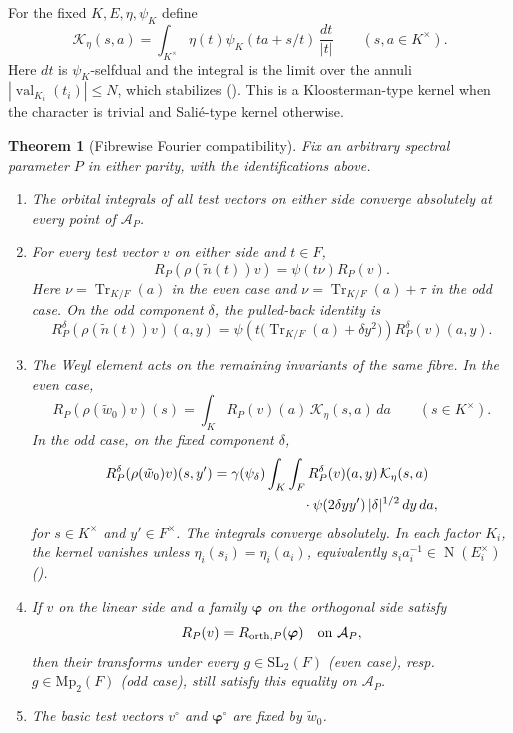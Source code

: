 \documentclass[11pt,oneside,notitlepage]{book}
\numberwithin{equation}{section}
\theoremstyle{plain}
\newtheorem{theorem}{Theorem}[section]
\theoremstyle{definition}
\newcommand{\SL}{\mathrm{SL}}
\newcommand{\Mp}{\mathrm{Mp}}
\newcommand{\Tr}{\operatorname{Tr}}
\newcommand{\N}{\operatorname{N}}
\newcommand{\val}{\operatorname{val}}
\begin{document}
 For the fixed $K,E,\eta,\psi_K$ define
\begin{equation}\label{eq:kernel}
 \mathcal K_\eta(s,a)
 =\int_{K^\times}\eta(t)\psi_K(ta+s/t)\,\frac{dt}{|t|}
 \qquad(s,a\in K^\times).
\end{equation}
Here $dt$ is $\psi_K$-selfdual and the integral is the limit over the annuli $|\val_{K_i}(t_i)|\le N$, which stabilizes (). This is a Kloosterman-type kernel when the character is trivial and  Sali\'e-type kernel otherwise.



\begin{theorem}[Fibrewise Fourier compatibility]\label{thm:fourier}
Fix an arbitrary spectral parameter $P$ in either parity, with the identifications above.
\begin{enumerate}[label=(\arabic*)]
\item The orbital integrals of all test vectors on either side converge absolutely at every point of $\mathcal A_P$.
\item For every test vector $v$ on either side and $t\in F$,
\[
 R_P(\rho(\tilde n(t))v)=\psi(t\nu)R_P(v).
\]
Here $\nu=\Tr_{K/F}(a)$ in the even case and $\nu=\Tr_{K/F}(a)+\tau$ in the odd case. On the odd component $\delta$, the pulled-back identity is
\[
 R_P^\delta(\rho(\tilde n(t))v)(a,y)
 =\psi\!\left(t\bigl(\Tr_{K/F}(a)+\delta y^2\bigr)\right)
 R_P^\delta(v)(a,y).
\]
\item The Weyl element acts on the remaining invariants of the same fibre. In the even case,
\[
 R_P(\rho(\tilde w_0)v)(s)
 =\int_K R_P(v)(a)\,\mathcal K_\eta(s,a)\,da
 \qquad(s\in K^\times).
\]
In the odd case, on the fixed component $\delta$,
\[
 \begin{split}
 R_P^\delta(\rho(\tilde w_0)v)(s,y')
 ={}&\gamma(\psi_\delta)\int_K\int_F
 R_P^\delta(v)(a,y)\,\mathcal K_\eta(s,a)\\
 &\hspace{18mm}\cdot\psi(2\delta yy')\,|\delta|^{1/2}\,dy\,da,
 \end{split}
\]
for $s\in K^\times$ and $y'\in F^\times$. The integrals converge absolutely. In each factor $K_i$, the kernel vanishes unless $\eta_i(s_i)=\eta_i(a_i)$, equivalently $s_ia_i^{-1}\in\N(E_i^\times)$ (). %
\item If $v$ on the linear side and a family $\boldsymbol\varphi$ on the orthogonal side satisfy
\[
 R_P(v)=R_{{\rm orth},P}(\boldsymbol\varphi)
 \quad\text{on }\mathcal A_P,
\]
then their transforms under every $g\in\SL_2(F)$ (even case), resp.\ $g\in\Mp_2(F)$ (odd case), still satisfy this equality on $\mathcal A_P$. %
\item The basic test vectors $v^\circ$ and $\boldsymbol\varphi^\circ$ are fixed by $\tilde w_0$.
\end{enumerate}
\end{theorem}
\end{document}
